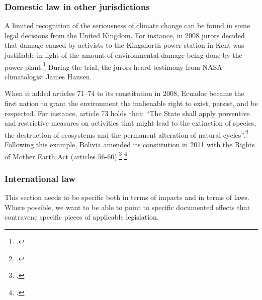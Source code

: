 		\subsubsection{Domestic law in other jurisdictions}
		
		
		
A limited recognition of the seriousness of climate change can be found in some legal decisions from the United Kingdom.
For instance, in 2008 jurors decided that damage caused by activists to the Kingsnorth power station in Kent was justifiable in light of the amount of environmental damage being done by the power plant.\footcite[][]{JuryDecides}
During the trial, the jurors heard testimony from NASA climatologist James Hansen.


When it added articles 71--74 to its constitution in 2008, Ecuador became the first nation to grant the environment the inalienable right to exist, persist, and be respected.
For instance, article 73 holds that: ``The State shall apply preventive and restrictive measures on activities that might lead to the extinction of species, the destruction of ecosystems and the permanent alteration of natural cycles''.\footcite[][]{EcuadorConstitution}
Following this example, Bolivia amended its constitution in 2011 with the Rights of Mother Earth Act (articles 56-60).\footcite[][p. 28--29]{BoliviaConstitution} \footcite[][]{BoliviaGives}



		\subsubsection{International law}



		\begin{vcom}
		This section needs to be specific both in terms of impacts and in terms of laws. Where possible, we want to be able to point to specific documented effects that contravene specific pieces of applicable legislation.
		\end{vcom}



